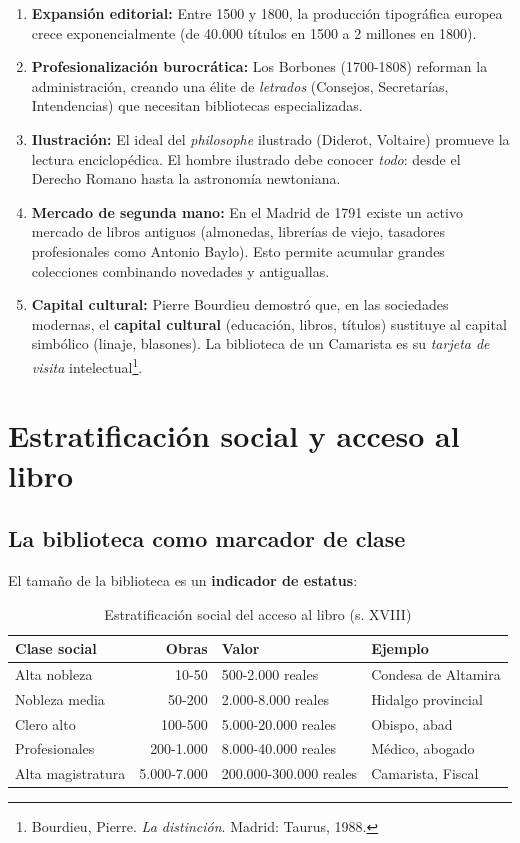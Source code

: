 \documentclass[12pt,a4paper]{article}
\begin{document}
\begin{enumerate}
\item \textbf{Expansión editorial:} Entre 1500 y 1800, la producción tipográfica europea crece exponencialmente (de 40.000 títulos en 1500 a 2 millones en 1800).

\item \textbf{Profesionalización burocrática:} Los Borbones (1700-1808) reforman la administración, creando una élite de \textit{letrados} (Consejos, Secretarías, Intendencias) que necesitan bibliotecas especializadas.

\item \textbf{Ilustración:} El ideal del \textit{philosophe} ilustrado (Diderot, Voltaire) promueve la lectura enciclopédica. El hombre ilustrado debe conocer \textit{todo}: desde el Derecho Romano hasta la astronomía newtoniana.

\item \textbf{Mercado de segunda mano:} En el Madrid de 1791 existe un activo mercado de libros antiguos (almonedas, librerías de viejo, tasadores profesionales como Antonio Baylo). Esto permite acumular grandes colecciones combinando novedades y antiguallas.

\item \textbf{Capital cultural:} Pierre Bourdieu demostró que, en las sociedades modernas, el \textbf{capital cultural} (educación, libros, títulos) sustituye al capital simbólico (linaje, blasones). La biblioteca de un Camarista es su \textit{tarjeta de visita} intelectual\footnote{Bourdieu, Pierre. \textit{La distinción}. Madrid: Taurus, 1988.}.
\end{enumerate}

\section{Estratificación social y acceso al libro}

\subsection{La biblioteca como marcador de clase}

El tamaño de la biblioteca es un \textbf{indicador de estatus}:

\begin{table}[h]
\centering
\begin{tabular}{lrll}
\toprule
\textbf{Clase social} & \textbf{Obras} & \textbf{Valor} & \textbf{Ejemplo} \\
\midrule
Alta nobleza & 10-50 & 500-2.000 reales & Condesa de Altamira \\
Nobleza media & 50-200 & 2.000-8.000 reales & Hidalgo provincial \\
Clero alto & 100-500 & 5.000-20.000 reales & Obispo, abad \\
Profesionales & 200-1.000 & 8.000-40.000 reales & Médico, abogado \\
\rowcolor{yellow!30}Alta magistratura & 5.000-7.000 & 200.000-300.000 reales & Camarista, Fiscal \\
\bottomrule
\end{tabular}
\caption{Estratificación social del acceso al libro (s. XVIII)}
\end{table}
\end{document}
